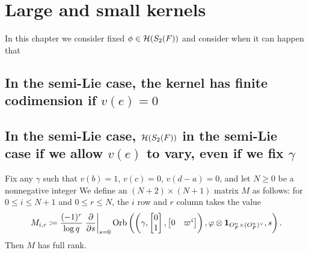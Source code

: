 \chapter{Large and small kernels}
\label{ch:ker}

In this chapter we consider fixed $\phi \in \mathcal H(S_2(F))$ and consider
when it can happen that


\section{In the semi-Lie case, the kernel has finite codimension if $v(e) = 0$}
\section{In the semi-Lie case, $\mathcal H(S_2(F))$ in the semi-Lie case if we allow $v(e)$ to vary, even if we fix $\gamma$}
\begin{lemma}
  Fix any $\gamma$ such that $v(b) = 1$, $v(c) = 0$, $v(d-a) = 0$,
  and let $N \ge 0$ be a nonnegative integer
  We define an $(N+2) \times (N+1)$ matrix $M$ as follows:
  for $0 \le i \le N+1$ and $0 \le r \le N$,
  the $i$ row and $r$ column takes the value
  \[
    M_{i,r} \coloneqq
    \frac{(-1)^r}{\log q}
    \left. \pdv{}{s} \right\rvert_{s=0}
      \operatorname{Orb}\left( \left(\gamma, \begin{bmatrix} 0 \\ 1 \end{bmatrix},
      \begin{bmatrix} 0 & \varpi^i \end{bmatrix} \right),
      \varphi \otimes \mathbf{1}_{O_F^n \times (O_F^n)^\vee}, s\right).
  \]
  Then $M$ has full rank.
\end{lemma}
